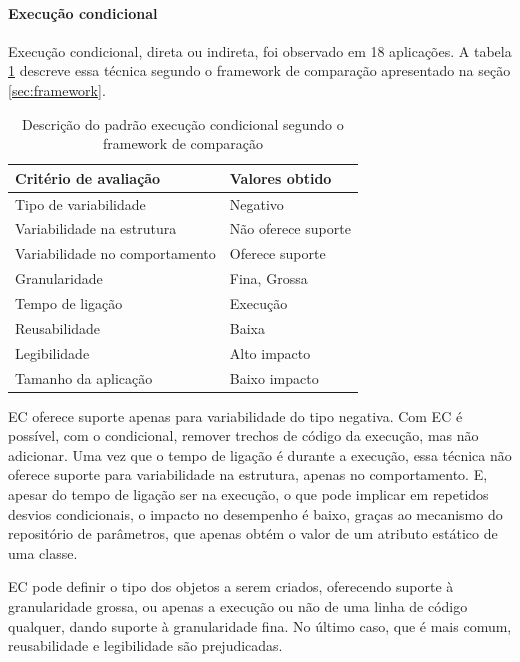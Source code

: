 \paragraph{Execução condicional}

Execução condicional, direta ou indireta, foi observado em 18 aplicações.
A tabela \ref{tab:fw_EC} descreve essa técnica segundo o framework de
comparação apresentado na seção \ref{sec:framework}.

\begin{table}[!htbp]
  \centering	
  \caption{Descrição do padrão execução condicional segundo o framework de comparação}
  \label{tab:fw_EC}
  \begin{tabular}{ | l | l |}
    \hline
    \textbf{Critério de avaliação} 	& \textbf{Valores obtido}  \\ \hline
    Tipo de variabilidade 			& Negativo  \\ \hline
    Variabilidade na estrutura 		& Não oferece suporte \\ \hline
    Variabilidade no comportamento 	& Oferece suporte \\ \hline
    Granularidade 					& Fina, Grossa \\ \hline
    Tempo de ligação 				& Execução \\ \hline
    Reusabilidade 					& Baixa \\ \hline
    Legibilidade 					& Alto impacto \\ \hline
    Tamanho da aplicação 			& Baixo impacto \\ \hline
  \end{tabular}
\end{table}

EC oferece suporte apenas para variabilidade do tipo negativa. Com EC é possível,
com o condicional, remover trechos de código da execução, mas não adicionar. Uma
vez que o tempo de ligação é durante a  execução, essa técnica não oferece suporte
para variabilidade na estrutura, apenas no comportamento. E, apesar do tempo de
ligação ser na execução, o que pode implicar em repetidos desvios condicionais,
o impacto no desempenho é baixo, graças ao mecanismo do repositório de parâmetros,
que apenas obtém o valor de um atributo estático de uma classe.

EC pode definir o tipo dos objetos a serem criados, oferecendo suporte à granularidade
grossa, ou apenas a execução ou não de uma linha de código qualquer, dando suporte à
granularidade fina. No último caso, que é mais comum,  reusabilidade e legibilidade
são prejudicadas. 

